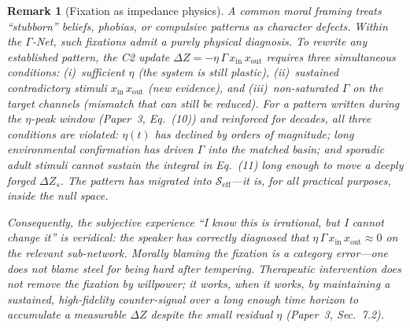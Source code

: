 \documentclass[aps,pre,twocolumn,superscriptaddress,floatfix]{revtex4-2}
\newtheorem{remark}{Remark}
\begin{document}
\begin{remark}[Fixation as impedance physics]
\label{rem:fixation}
A common moral framing treats ``stubborn'' beliefs, phobias,
or compulsive patterns as character defects.
Within the $\Gamma$-Net, such fixations admit a purely
physical diagnosis.
To rewrite any established pattern, the C2 update
$\Delta Z = -\eta\,\Gamma\,x_{\text{in}}\,x_{\text{out}}$
requires three simultaneous conditions:
(i)~sufficient $\eta$ (the system is still plastic),
(ii)~sustained contradictory stimuli
$x_{\text{in}}\,x_{\text{out}}$ (new evidence),
and (iii)~non-saturated $\Gamma$ on the target channels
(mismatch that can still be reduced).
For a pattern written during the $\eta$-peak window
(Paper~3, Eq.~(10)) and reinforced for decades,
all three conditions are violated:
$\eta(t)$ has declined by orders of magnitude;
long environmental confirmation has driven $\Gamma$
into the matched basin;
and sporadic adult stimuli cannot sustain the integral
in Eq.~(11) long enough to move a deeply forged
$\Delta Z_s$.
The pattern has migrated into
$\mathcal{S}_{\text{eff}}$---it is, for all practical
purposes, \emph{inside the null space}.

Consequently, the subjective experience
``I know this is irrational, but I cannot change it''
is \emph{veridical}: the speaker has correctly diagnosed
that $\eta\,\Gamma\,x_{\text{in}}\,x_{\text{out}}\approx 0$
on the relevant sub-network.
Morally blaming the fixation is a category error---one
does not blame steel for being hard after tempering.
Therapeutic intervention does not remove the fixation
by willpower; it works, when it works, by maintaining
a sustained, high-fidelity counter-signal over a long
enough time horizon to accumulate a measurable
$\Delta Z$ despite the small residual $\eta$
(Paper~3, Sec.~7.2).
\end{remark}
\end{document}
